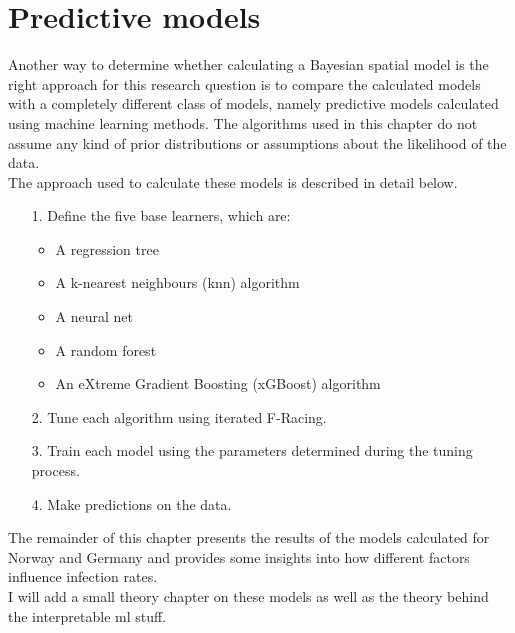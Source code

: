 \section{Predictive models}
Another way to determine whether calculating a Bayesian spatial model is the right approach for this research question is to compare the calculated models with a completely different class of models, namely predictive models calculated using machine learning methods. The algorithms used in this chapter do not assume any kind of prior distributions or assumptions about the likelihood of the data.\\
The approach used to calculate these models is described in detail below.
\begin{itemize}
    \item[1.] Define the five base learners, which are:
    \begin{itemize}
        \item A regression tree
        \item A k-nearest neighbours (knn) algorithm
        \item A neural net
        \item A random forest
        \item An eXtreme Gradient Boosting (xGBoost) algorithm
    \end{itemize}
    \item[2.] Tune each algorithm using iterated F-Racing.
    \item[3.] Train each model using the parameters determined during the tuning process.
    \item[4.] Make predictions on the data.
\end{itemize}
The remainder of this chapter presents the results of the models calculated for Norway and Germany and provides some insights into how different factors influence infection rates. \\
I will add a small theory chapter on these models as well as the theory behind the interpretable ml stuff.
